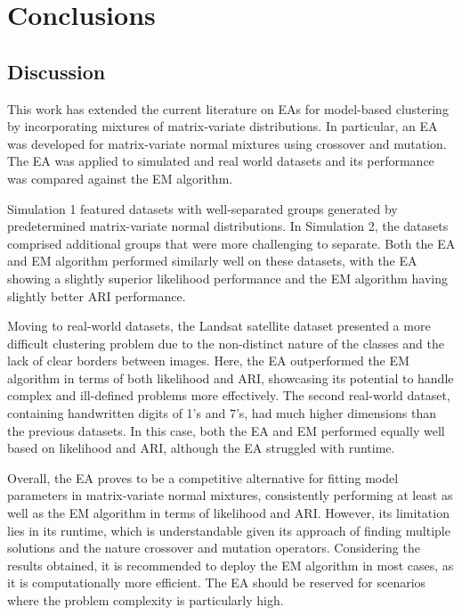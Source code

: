 \documentclass[12pt]{report}
\begin{document}


\chapter{Conclusions}




\section{Discussion}
This work has extended the current literature on EAs for model-based clustering by incorporating mixtures of matrix-variate distributions. In particular, an EA was developed for matrix-variate normal mixtures using crossover and mutation. The EA was applied to simulated and real world datasets and its performance was compared against the EM algorithm. 

Simulation 1 featured datasets with well-separated groups generated by predetermined matrix-variate normal distributions. In Simulation 2, the datasets comprised additional groups that were more challenging to separate. Both the EA and EM algorithm performed similarly well on these datasets, with the EA showing a slightly superior likelihood performance and the EM algorithm having slightly better ARI performance.

Moving to real-world datasets, the Landsat satellite dataset presented a more difficult clustering problem due to the non-distinct nature of the classes and the lack of clear borders between images. Here, the EA outperformed the EM algorithm in terms of both likelihood and ARI, showcasing its potential to handle complex and ill-defined problems more effectively. The second real-world dataset, containing handwritten digits of 1's and 7's, had much higher dimensions than the previous datasets. In this case, both the EA and EM performed equally well based on likelihood and ARI, although the EA struggled with runtime. 

Overall, the EA proves to be a competitive alternative for fitting model parameters in matrix-variate normal mixtures, consistently performing at least as well as the EM algorithm in terms of likelihood and ARI. However, its limitation lies in its runtime, which is understandable given its approach of finding multiple solutions and the nature crossover and mutation operators. Considering the results obtained, it is recommended to deploy the EM algorithm in most cases, as it is computationally more efficient. The EA should be reserved for scenarios where the problem complexity is particularly high.
\end{document}

